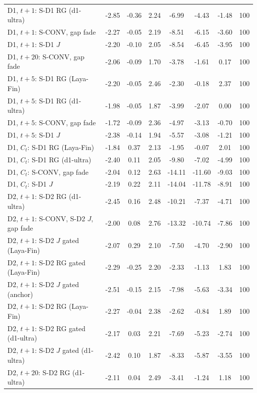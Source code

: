 \begin{longtable}{@{}>{\raggedright\arraybackslash}p{2.3in}S[table-format=-1.2]S[table-format=-1.2]S[table-format=1.2]S[table-format=-2.2]S[table-format=-2.2]S[table-format=-1.2]S[table-format=3.0]@{}}
D1, $t{+}1$: S-D1 RG (d1-ultra) & -2.85 & -0.36 & 2.24 & -6.99 & -4.43 & -1.48 & 100 \\
D1, $t{+}1$: S-CONV, gap fade & -2.27 & -0.05 & 2.19 & -8.51 & -6.15 & -3.60 & 100 \\
D1, $t{+}1$: S-D1 $J$ & -2.20 & -0.10 & 2.05 & -8.54 & -6.45 & -3.95 & 100 \\
D1, $t{+}20$: S-CONV, gap fade & -2.06 & -0.09 & 1.70 & -3.78 & -1.61 & 0.17 & 100 \\
D1, $t{+}5$: S-D1 RG (Laya-Fin) & -2.20 & -0.05 & 2.46 & -2.30 & -0.18 & 2.37 & 100 \\
D1, $t{+}5$: S-D1 RG (d1-ultra) & -1.98 & -0.05 & 1.87 & -3.99 & -2.07 & 0.00 & 100 \\
D1, $t{+}5$: S-CONV, gap fade & -1.72 & -0.09 & 2.36 & -4.97 & -3.13 & -0.70 & 100 \\
D1, $t{+}5$: S-D1 $J$ & -2.38 & -0.14 & 1.94 & -5.57 & -3.08 & -1.21 & 100 \\
D1, $C_t$: S-D1 RG (Laya-Fin) & -1.84 & 0.37 & 2.13 & -1.95 & -0.07 & 2.01 & 100 \\
D1, $C_t$: S-D1 RG (d1-ultra) & -2.40 & 0.11 & 2.05 & -9.80 & -7.02 & -4.99 & 100 \\
D1, $C_t$: S-CONV, gap fade & -2.04 & 0.12 & 2.63 & -14.11 & -11.60 & -9.03 & 100 \\
D1, $C_t$: S-D1 $J$ & -2.19 & 0.22 & 2.11 & -14.04 & -11.78 & -8.91 & 100 \\
D2, $t{+}1$: S-D2 RG (d1-ultra) & -2.45 & 0.16 & 2.48 & -10.21 & -7.37 & -4.71 & 100 \\
D2, $t{+}1$: S-CONV, S-D2 $J$, gap fade & -2.00 & 0.08 & 2.76 & -13.32 & -10.74 & -7.86 & 100 \\
D2, $t{+}1$: S-D2 $J$ gated (Laya-Fin) & -2.07 & 0.29 & 2.10 & -7.50 & -4.70 & -2.90 & 100 \\
D2, $t{+}1$: S-D2 RG gated (Laya-Fin) & -2.29 & -0.25 & 2.20 & -2.33 & -1.13 & 1.83 & 100 \\
D2, $t{+}1$: S-D2 $J$ gated (anchor) & -2.51 & -0.15 & 2.15 & -7.98 & -5.63 & -3.34 & 100 \\
D2, $t{+}1$: S-D2 RG (Laya-Fin) & -2.27 & -0.04 & 2.38 & -2.62 & -0.84 & 1.89 & 100 \\
D2, $t{+}1$: S-D2 RG gated (d1-ultra) & -2.17 & 0.03 & 2.21 & -7.69 & -5.23 & -2.74 & 100 \\
D2, $t{+}1$: S-D2 $J$ gated (d1-ultra) & -2.42 & 0.10 & 1.87 & -8.33 & -5.87 & -3.55 & 100 \\
D2, $t{+}20$: S-D2 RG (d1-ultra) & -2.11 & 0.04 & 2.49 & -3.41 & -1.24 & 1.18 & 100 \\

\end{longtable}
